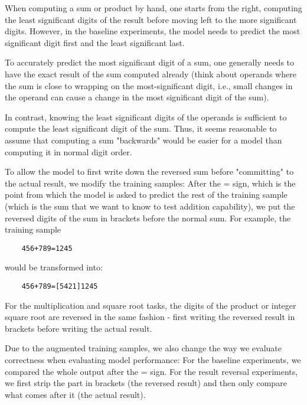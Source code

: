 When computing a sum or product by hand, one starts from the right, computing the least significant digits of the result before moving left to the more significant digits. However, in the baseline experiments, the model needs to predict the most significant digit first and the least significant last.

To accurately predict the most significant digit of a sum, one generally needs to have the exact result of the sum computed already (think about operands where the sum is close to wrapping on the most-significant digit, i.e., small changes in the operand can cause a change in the most significant digit of the sum).

In contrast, knowing the least significant digits of the operands is sufficient to compute the least significant digit of the sum. Thus, it seems reasonable to assume that computing a sum "backwards" would be easier for a model than computing it in normal digit order.


To allow the model to first write down the reversed sum before "committing" to the actual result, we modify the training samples: After the = sign, which is the point from which the model is asked to predict the rest of the training sample (which is the sum that we want to know to test addition capability), we put the reversed digits of the sum in brackets before the normal sum.
For example, the training sample

\begin{lstlisting}
	456+789=1245
\end{lstlisting}

\noindent
would be transformed into:

\begin{lstlisting}
	456+789=[5421]1245
\end{lstlisting}

For the multiplication and square root tasks, the digits of the product or integer square root are reversed in the same fashion - first writing the reversed result in brackets before writing the actual result.

\noindent
Due to the augmented training samples, we also change the way we evaluate correctness when evaluating model performance: For the baseline experiments, we compared the whole output after the = sign. For the result reversal experiments, we first strip the part in brackets (the reversed result) and then only compare what comes after it (the actual result).





